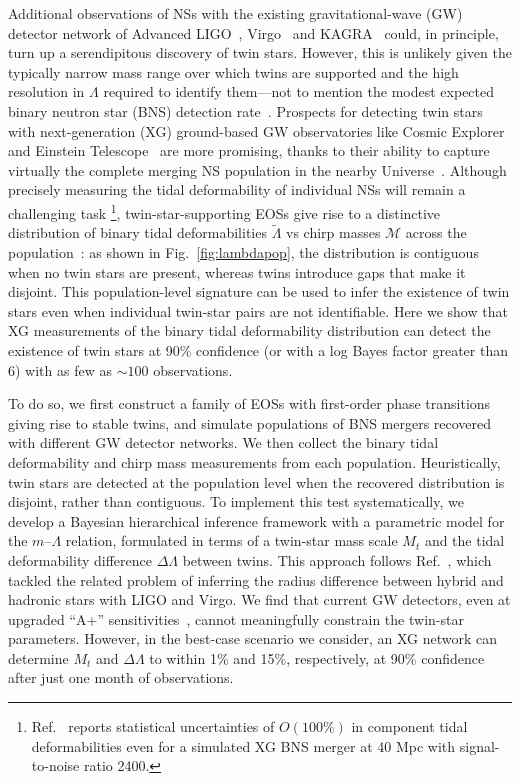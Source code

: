 \documentclass[aps,prl,twocolumn,superscriptaddress,footinbib]{revtex4-1}
\begin{document}
Additional observations of NSs with the existing gravitational-wave (GW) detector network of Advanced LIGO~\cite{aLIGO}, Virgo~\cite{aVirgo} and KAGRA~\cite{AkutsuAndo2021} could, in principle, turn up a serendipitous discovery of twin stars. However, this is unlikely given the typically narrow mass range over which twins are supported and the high resolution in $\Lambda$ required to identify them---not to mention the modest expected binary neutron star (BNS) detection rate~\cite{AbbottAbbott2018_ObservingScenarios,ColomboSalafia2022,PatricelliBernardini2022}.
Prospects for detecting twin stars with next-generation (XG) ground-based GW observatories like Cosmic Explorer~\cite{EvansAdhikari2021} and Einstein Telescope~\cite{MaggioreVanDenBroeck2020} are more promising, thanks to their ability to capture virtually the complete merging NS population in the nearby Universe~\cite{EvansAdhikari2021,BorhanianSathyaprakash2022}. Although precisely measuring the tidal deformability of individual NSs will remain a challenging task \footnote{Ref.~\cite{SmithBorhanian2021} reports statistical uncertainties of $O(100\%)$ in component tidal deformabilities even for a simulated XG BNS merger at 40 Mpc with signal-to-noise ratio 2400.}, twin-star-supporting EOSs give rise to a distinctive distribution of binary tidal deformabilities $\tilde{\Lambda}$ vs chirp masses $\mathcal{M}$ across the population~\cite{ChatziioannouHan2020}: as shown in Fig.~\ref{fig:lambdapop}, the distribution is contiguous when no twin stars are present, whereas twins introduce gaps that make it disjoint. This population-level signature can be used to infer the existence of twin stars even when individual twin-star pairs are not identifiable. Here we show that XG measurements of the binary tidal deformability distribution can detect the existence of twin stars at 90\% confidence (or with a log Bayes factor greater than 6) with as few as $\sim 100$ observations.

To do so, we first construct a family of EOSs with first-order phase transitions giving rise to stable twins, and simulate populations of BNS mergers recovered with different GW detector networks. We then collect the binary tidal deformability and chirp mass measurements from each population. Heuristically, twin stars are detected at the population level when the recovered distribution is disjoint, rather than contiguous. To implement this test systematically, we develop a Bayesian hierarchical inference framework with a parametric model for the $m$--$\Lambda$ relation, formulated in terms of a twin-star mass scale $M_t$ and the tidal deformability difference $\Delta\Lambda$ between twins. This approach follows Ref.~\cite{ChatziioannouHan2020}, which tackled the related problem of inferring the radius difference between hybrid and hadronic stars with LIGO and Virgo.
We find that current GW detectors, even at upgraded ``A+'' sensitivities~\cite{AbbottAbbott2018_ObservingScenarios}, cannot meaningfully constrain the twin-star parameters. However, in the best-case scenario we consider, an XG network can determine $M_t$ and $\Delta\Lambda$ to within 1\% and 15\%, respectively, at 90\% confidence after just one month of observations.
\end{document}
